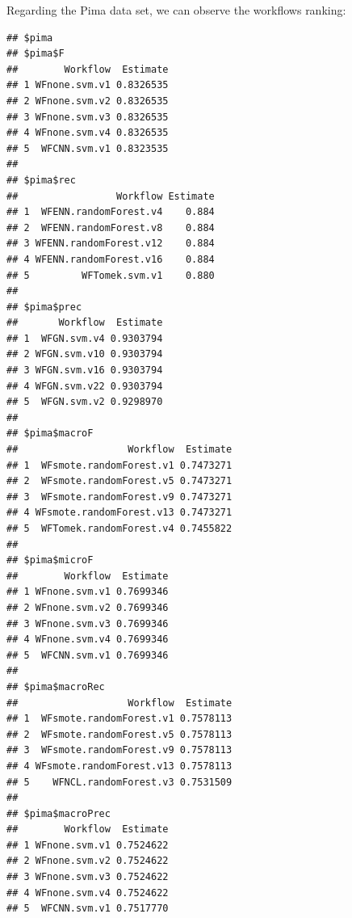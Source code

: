 \documentclass[10pt,a4paper]{article}\usepackage[]{graphicx}\usepackage[]{color}
\makeatletter
\newenvironment{kframe}{%
 \def\at@end@of@kframe{}%
 \ifinner\ifhmode%
  \def\at@end@of@kframe{\end{minipage}}%
  \begin{minipage}{\columnwidth}%
 \fi\fi%
 \def\FrameCommand##1{\hskip\@totalleftmargin \hskip-\fboxsep
 \colorbox{shadecolor}{##1}\hskip-\fboxsep
     \hskip-\linewidth \hskip-\@totalleftmargin \hskip\columnwidth}%
 \MakeFramed {\advance\hsize-\width
   \@totalleftmargin\z@ \linewidth\hsize
   \@setminipage}}%
 {\par\unskip\endMakeFramed%
 \at@end@of@kframe}
\newenvironment{knitrout}{}{} %
\makeatother
\begin{document}
Regarding the Pima data set, we can observe the workflows ranking:
\begin{knitrout}\footnotesize
{}\color{fgcolor}\begin{kframe}
\begin{verbatim}
## $pima
## $pima$F
##        Workflow  Estimate
## 1 WFnone.svm.v1 0.8326535
## 2 WFnone.svm.v2 0.8326535
## 3 WFnone.svm.v3 0.8326535
## 4 WFnone.svm.v4 0.8326535
## 5  WFCNN.svm.v1 0.8323535
## 
## $pima$rec
##                 Workflow Estimate
## 1  WFENN.randomForest.v4    0.884
## 2  WFENN.randomForest.v8    0.884
## 3 WFENN.randomForest.v12    0.884
## 4 WFENN.randomForest.v16    0.884
## 5         WFTomek.svm.v1    0.880
## 
## $pima$prec
##       Workflow  Estimate
## 1  WFGN.svm.v4 0.9303794
## 2 WFGN.svm.v10 0.9303794
## 3 WFGN.svm.v16 0.9303794
## 4 WFGN.svm.v22 0.9303794
## 5  WFGN.svm.v2 0.9298970
## 
## $pima$macroF
##                   Workflow  Estimate
## 1  WFsmote.randomForest.v1 0.7473271
## 2  WFsmote.randomForest.v5 0.7473271
## 3  WFsmote.randomForest.v9 0.7473271
## 4 WFsmote.randomForest.v13 0.7473271
## 5  WFTomek.randomForest.v4 0.7455822
## 
## $pima$microF
##        Workflow  Estimate
## 1 WFnone.svm.v1 0.7699346
## 2 WFnone.svm.v2 0.7699346
## 3 WFnone.svm.v3 0.7699346
## 4 WFnone.svm.v4 0.7699346
## 5  WFCNN.svm.v1 0.7699346
## 
## $pima$macroRec
##                   Workflow  Estimate
## 1  WFsmote.randomForest.v1 0.7578113
## 2  WFsmote.randomForest.v5 0.7578113
## 3  WFsmote.randomForest.v9 0.7578113
## 4 WFsmote.randomForest.v13 0.7578113
## 5    WFNCL.randomForest.v3 0.7531509
## 
## $pima$macroPrec
##        Workflow  Estimate
## 1 WFnone.svm.v1 0.7524622
## 2 WFnone.svm.v2 0.7524622
## 3 WFnone.svm.v3 0.7524622
## 4 WFnone.svm.v4 0.7524622
## 5  WFCNN.svm.v1 0.7517770
\end{verbatim}
\end{kframe}
\end{knitrout}
\end{document}
